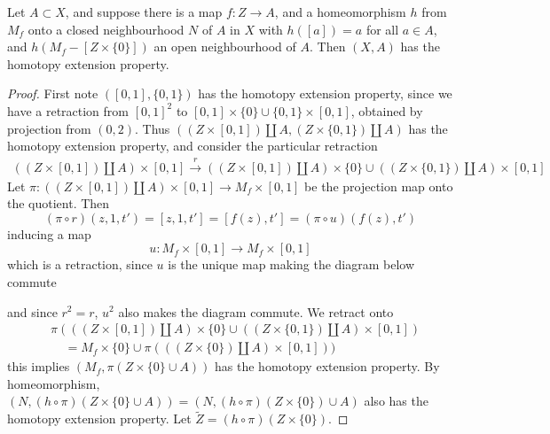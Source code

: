 \begin{lemma}
    Let $A \subset X$, and suppose there is a map $f:Z \to A$, and a homeomorphism $h$ from $M_f$ onto a closed neighbourhood $N$ of $A$ in $X$ with $h([a]) = a$ for all $a \in A$, and $h(M_f - [Z \times \{ 0 \}])$ an open neighbourhood of $A$. Then $(X,A)$ has the homotopy extension property.
\end{lemma}
\begin{proof}
    First note $([0,1], \{ 0, 1 \})$ has the homotopy extension property, since we have a retraction from $[0,1]^2$ to $[0,1] \times \{ 0 \} \cup \{ 0,1 \} \times [0,1]$, obtained by projection from $(0,2)$. Thus $((Z \times [0,1]) \coprod A, (Z \times \{ 0, 1 \}) \coprod A)$ has the homotopy extension property, and consider the particular retraction
    \begin{align*}
        ((Z \times [0,1]) \coprod A) \times [0,1] \xrightarrow{r} ((Z \times [0,1]) \coprod A) \times \{ 0 \} \cup ((Z \times \{ 0, 1 \}) \coprod A) \times [0,1]
    \end{align*}
    Let $\pi: ((Z \times [0,1]) \coprod A) \times [0,1] \to M_f \times [0,1]$ be the projection map onto the quotient. Then
    \[ (\pi \circ r)(z,1,t') = [z,1,t'] = [f(z),t'] = (\pi \circ u)(f(z),t') \]
    inducing a map
    \[ u: M_f \times [0,1] \to M_f \times [0,1] \]
    which is a retraction, since $u$ is the unique map making the diagram below commute
    \begin{center}
    \end{center}
    and since $r^2 = r$, $u^2$ also makes the diagram commute. We retract onto
    \begin{align*}
        &\pi(((Z \times [0,1]) \coprod A) \times \{ 0 \} \cup ((Z \times \{ 0, 1 \}) \coprod A) \times [0,1])\\
        &\ \ \ \ \ = M_f \times \{ 0 \} \cup \pi(((Z \times \{ 0 \}) \coprod A) \times [0,1]))
    \end{align*}
    this implies $(M_f, \pi(Z \times \{ 0 \} \cup A))$ has the homotopy extension property. By homeomorphism, $(N, (h \circ \pi)(Z \times \{ 0 \} \cup A)) = (N, (h \circ \pi)(Z \times \{ 0 \}) \cup A)$ also has the homotopy extension property. Let $\widetilde{Z} = (h \circ \pi)(Z \times \{ 0 \})$.


\end{proof}
